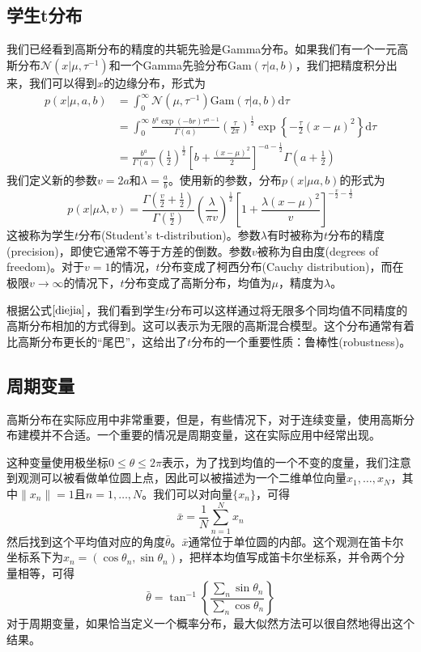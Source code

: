 \subsection*{学生t分布}
我们已经看到高斯分布的精度的共轭先验是Gamma分布。如果我们有一个一元高斯分布$\mathcal{N}(x|\mu,\tau^{-1})$和一个Gamma先验分布$\mathrm{Gam}(\tau|a,b)$，我们把精度积分出来，我们可以得到$x$的边缘分布，形式为
\begin{equation}
\label{diejia}
	\begin{aligned}
		p(x|\mu,a,b)&=\int_0^{\infty} \mathcal{N}(\mu,\tau^{-1})\mathrm{Gam}(\tau|a,b)\mathrm{d}\tau\\
		&=\int_0^{\infty}\frac{b^a\exp(-br)\tau^{a-1}}{\Gamma(a)}\left(\frac{\tau}{2\pi} \right)^{\frac{1}{2}}\exp\left\{-\frac{\tau}{2}(x-\mu)^2 \right\}\mathrm{d}\tau\\
		&=\frac{b^a}{\Gamma(a)}\left(\frac{1}{2}\right)^{\frac{1}{2}}\left[b+\frac{(x-\mu)^2}{2} \right]^{-a-\frac{1}{2}}\Gamma(a+\frac{1}{2})
	\end{aligned}
\end{equation}
我们定义新的参数$v=2a$和$\lambda=\frac{a}{b}$。使用新的参数，分布$p(x|\mu a,b)$的形式为
\begin{equation}
	p(x|\mu \lambda,v)=\frac{\Gamma(\frac{v}{2}+\frac{1}{2})}{\Gamma(\frac{v}{2})}\left(\frac{\lambda}{\pi v} \right)^{\frac{1}{2}}\left[1+\frac{\lambda(x-\mu)^2}{v} \right]^{-\frac{v}{2}-\frac{1}{2}}
\end{equation}
这被称为学生$t$分布(Student's t-distribution)。参数$\lambda$有时被称为$t$分布的精度(precision)，即使它通常不等于方差的倒数。参数$v$被称为自由度(degrees of freedom)。对于$v=1$的情况，$t$分布变成了柯西分布(Cauchy distribution)，而在极限$v\to \infty$的情况下，$t$分布变成了高斯分布，均值为$\mu$，精度为$\lambda$。

根据公式$\ref{diejia}$，我们看到学生$t$分布可以这样通过将无限多个同均值不同精度的高斯分布相加的方式得到。这可以表示为无限的高斯混合模型。这个分布通常有着比高斯分布更长的“尾巴”，这给出了$t$分布的一个重要性质：鲁棒性(robustness)。
\subsection*{周期变量}
高斯分布在实际应用中非常重要，但是，有些情况下，对于连续变量，使用高斯分布建模并不合适。一个重要的情况是周期变量，这在实际应用中经常出现。

这种变量使用极坐标$0\leqslant \theta \leqslant 2\pi$表示，为了找到均值的一个不变的度量，我们注意到观测可以被看做单位圆上点，因此可以被描述为一个二维单位向量$x_1,\dots,x_N$，其中$\lVert x_n\rVert=1$且$n=1,\dots,N$。我们可以对向量$\{x_n \}$，可得
\begin{equation}
	\bar{x}=\frac{1}{N}\sum_{n=1}^{N}x_n
\end{equation}
然后找到这个平均值对应的角度$\bar{\theta}$。$\bar{x}$通常位于单位圆的内部。这个观测在笛卡尔坐标系下为$x_n=(\cos \theta_n,\sin \theta_n)$，把样本均值写成笛卡尔坐标系，并令两个分量相等，可得
\begin{equation}
	\bar{\theta}=\tan^{-1}\left\{\frac{\sum_n\sin\theta_n}{\sum_n \cos\theta_n} \right\}
\end{equation}
对于周期变量，如果恰当定义一个概率分布，最大似然方法可以很自然地得出这个结果。

